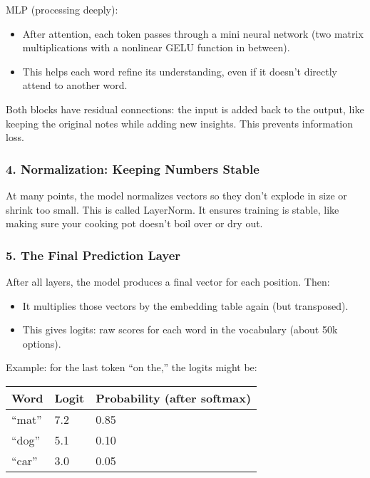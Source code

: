 \documentclass[
  letterpaper,
  DIV=11,
  numbers=noendperiod]{scrreprt}
\providecommand{\tightlist}{%
  \setlength{\itemsep}{0pt}\setlength{\parskip}{0pt}}
\begin{document}
MLP (processing deeply):

\begin{itemize}
\tightlist
\item
  After attention, each token passes through a mini neural network (two
  matrix multiplications with a nonlinear GELU function in between).
\item
  This helps each word refine its understanding, even if it doesn't
  directly attend to another word.
\end{itemize}

Both blocks have residual connections: the input is added back to the
output, like keeping the original notes while adding new insights. This
prevents information loss.

\subsubsection{4. Normalization: Keeping Numbers
Stable}\label{normalization-keeping-numbers-stable}

At many points, the model normalizes vectors so they don't explode in
size or shrink too small. This is called LayerNorm. It ensures training
is stable, like making sure your cooking pot doesn't boil over or dry
out.

\subsubsection{5. The Final Prediction
Layer}\label{the-final-prediction-layer}

After all layers, the model produces a final vector for each position.
Then:

\begin{itemize}
\tightlist
\item
  It multiplies those vectors by the embedding table again (but
  transposed).
\item
  This gives logits: raw scores for each word in the vocabulary (about
  50k options).
\end{itemize}

Example: for the last token ``on the,'' the logits might be:

\begin{longtable}[]{@{}lll@{}}
\toprule\noalign{}
Word & Logit & Probability (after softmax) \\
\midrule\noalign{}
\endhead
\bottomrule\noalign{}
\endlastfoot
``mat'' & 7.2 & 0.85 \\
``dog'' & 5.1 & 0.10 \\
``car'' & 3.0 & 0.05 \\
\end{longtable}
\end{document}
